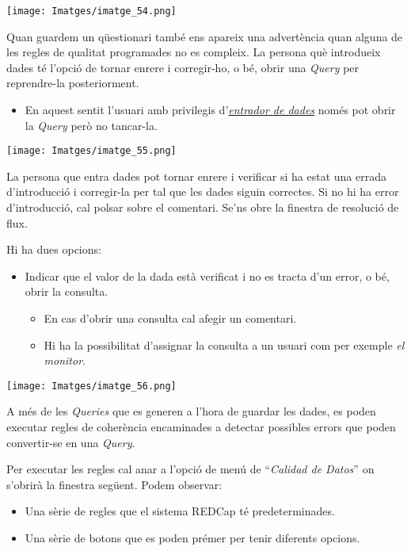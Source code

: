 \documentclass[
]{article}
\providecommand{\tightlist}{%
  \setlength{\itemsep}{0pt}\setlength{\parskip}{0pt}}
\begin{document}
\texttt{[image: Imatges/imatge\_54.png]}

Quan guardem un qüestionari també ens apareix una advertència quan alguna de les regles de qualitat programades no es compleix. La persona què introdueix dades té l'opció de tornar enrere i corregir-ho, o bé, obrir una \emph{Query} per reprendre-la posteriorment.

\begin{itemize}
\tightlist
\item
  En aquest sentit l'usuari amb privilegis d'\protect\hyperlink{en3}{\emph{entrador de dades}} només pot obrir la \emph{Query} però no tancar-la.
\end{itemize}

\texttt{[image: Imatges/imatge\_55.png]}

La persona que entra dades pot tornar enrere i verificar si ha estat una errada d'introducció i corregir-la per tal que les dades siguin correctes. Si no hi ha error d'introducció, cal polsar sobre el comentari. Se'ns obre la finestra de resolució de flux.

Hi ha dues opcions:

\begin{itemize}
\tightlist
\item
  Indicar que el valor de la dada està verificat i no es tracta d'un error, o bé, obrir la consulta.

  \begin{itemize}
  \tightlist
  \item
    En cas d'obrir una consulta cal afegir un comentari.
  \item
    Hi ha la possibilitat d'assignar la consulta a un usuari com per exemple \emph{el monitor}.
  \end{itemize}
\end{itemize}

\texttt{[image: Imatges/imatge\_56.png]}

A més de les \emph{Queries} que es generen a l'hora de guardar les dades, es poden executar regles de coherència encaminades a detectar possibles errors que poden convertir-se en una \emph{Query}.

Per executar les regles cal anar a l'opció de menú de ``\emph{Calidad de Datos}'' on s'obrirà la finestra següent. Podem observar:

\begin{itemize}
\tightlist
\item
  Una sèrie de regles que el sistema REDCap té predeterminades.
\item
  Una sèrie de botons que es poden prémer per tenir diferents opcions.
\end{itemize}
\end{document}
